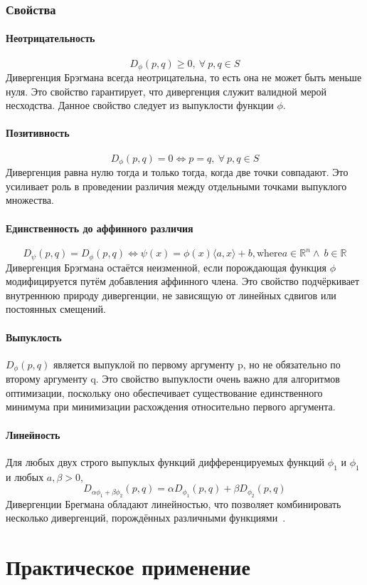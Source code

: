 \documentclass[12pt]{scrartcl}
\begin{document}
\subsubsection{Свойства}
\paragraph{Неотрицательность}\label{par:non-negativity}
\begin{equation}
    D_\phi(p,q) \geq 0,\ \forall \ p,q \in S
\end{equation}
Дивергенция Брэгмана всегда неотрицательна, то есть она не может быть меньше нуля. Это свойство гарантирует, что дивергенция служит валидной мерой несходства. Данное свойство следует из выпуклости функции $\phi$.
\paragraph{Позитивность}\label{par:positivity}
\begin{equation}
    D_\phi(p,q) = 0 \Longleftrightarrow p = q, \ \forall \ p,q \in S
\end{equation}
Дивергенция равна нулю тогда и только тогда, когда две точки совпадают. Это усиливает роль в проведении различия между отдельными точками выпуклого множества.
\paragraph{Единственность до аффинного различия}\label{par:affine_difference}
\begin{equation}
    D_\psi (p,q) = D_\phi(p,q) \Longleftrightarrow \psi(x) = \phi (x) \langle a, x \rangle + b, \text{where} a \in \mathbb{R}^n \wedge \ b \in \mathbb{R}
\end{equation}
Дивергенция Брэгмана остаётся неизменной, если порождающая функция $\phi$ модифицируется путём добавления аффинного члена. Это свойство подчёркивает внутреннюю природу дивергенции, не зависящую от линейных сдвигов или постоянных смещений.
\paragraph{Выпуклость} $D_\phi(p,q)$ является выпуклой по первому аргументу p, но не обязательно по второму аргументу q. Это свойство выпуклости очень важно для алгоритмов оптимизации, поскольку оно обеспечивает существование единственного минимума при минимизации расхождения относительно первого аргумента.
\paragraph{Линейность}\label{par:linearity}
Для любых двух строго выпуклых функций дифференцируемых функций $\phi_{1}$ и $\phi_{1}$ и любых $a,\beta > 0$,
\begin{equation}
    D_{\alpha \phi_{1} + \beta \phi_{2}}(p,q) = \alpha D_{\phi_{1}} (p,q) + \beta D_{\phi_{2}} (p,q)
\end{equation}
Дивергенции Брегмана обладают линейностью, что позволяет комбинировать несколько дивергенций, порождённых различными функциями~\cite{Reid2013}.
\section{Практическое применение}\label{sec:Case}






\printbibliography
\end{document}
